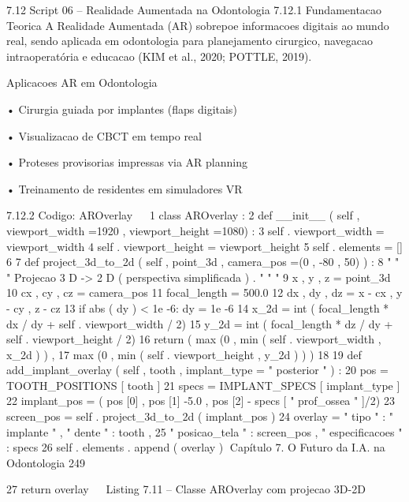     7.12       Script 06 – Realidade Aumentada na Odontologia
     7.12.1      Fundamentacao Teorica
     A Realidade Aumentada (AR) sobrepoe informacoes digitais ao mundo real, sendo
     aplicada em odontologia para planejamento cirurgico, navegacao intraoperatória e
     educacao (KIM et al., 2020; POTTLE, 2019).

         Aplicacoes AR em Odontologia

             • Cirurgia guiada por implantes (flaps digitais)

             • Visualizacao de CBCT em tempo real

             • Proteses provisorias impressas via AR planning

             • Treinamento de residentes em simuladores VR


     7.12.2      Codigo: AROverlay
                                                                                                 
 1 class AROverlay :
 2     def __init__ ( self , viewport_width =1920 , viewport_height =1080) :
 3         self . viewport_width = viewport_width
 4         self . viewport_height = viewport_height
 5         self . elements = []
 6
 7     def project_3d_to_2d ( self , point_3d , camera_pos =(0 , -80 , 50) ) :
 8         " " " Projecao 3 D -> 2 D ( perspectiva simplificada ) . " " "
 9         x , y , z = point_3d
10         cx , cy , cz = camera_pos
11         focal_length = 500.0
12         dx , dy , dz = x - cx , y - cy , z - cz
13         if abs ( dy ) < 1e -6: dy = 1e -6
14         x_2d = int ( focal_length * dx / dy + self . viewport_width / 2)
15         y_2d = int ( focal_length * dz / dy + self . viewport_height / 2)
16         return ( max (0 , min ( self . viewport_width , x_2d ) ) ,
17                    max (0 , min ( self . viewport_height , y_2d ) ) )
18
19     def add_implant_overlay ( self , tooth , implant_type = " posterior " ) :
20         pos = TOOTH_POSITIONS [ tooth ]
21         specs = IMPLANT_SPECS [ implant_type ]
22         implant_pos = ( pos [0] , pos [1] -5.0 , pos [2] - specs [ " prof_ossea " ]/2)
23         screen_pos = self . project_3d_to_2d ( implant_pos )
24         overlay = { " tipo " : " implante " , " dente " : tooth ,
25                        " posicao_tela " : screen_pos , " especificacoes " : specs }
26         self . elements . append ( overlay )
     Capítulo 7. O Futuro da I.A. na Odontologia                                       249


27              return overlay
                                                                                            
                         Listing 7.11 – Classe AROverlay com projecao 3D-2D


